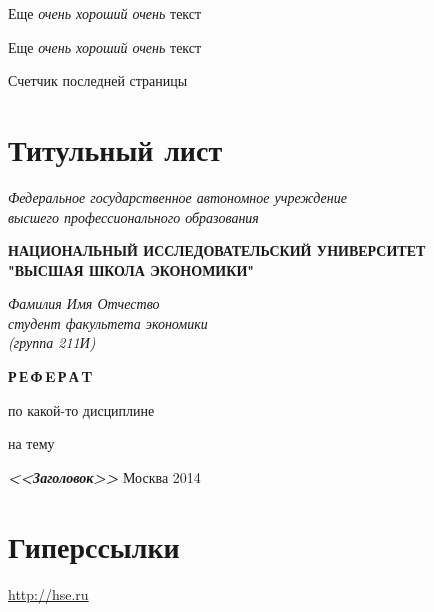 \documentclass[a4paper,14pt]{article}       %
\renewcommand{\familydefault}{\sfdefault}   %
\begin{document}
Еще \emph{очень \emph{хороший} очень} текст

Еще \emph{очень \textit{хороший} очень} текст

\newpage

Счетчик последней страницы \pageref{LastPage}

\renewcommand{\familydefault}{cmtt}\normalfont 
                                            

\section{Титульный лист}
\newpage
\thispagestyle{empty}                       %

\begin{center}
    \textit{Федеральное государственное автономное учреждение \\
    высшего профессионального образования}
    \vspace{0.5ex}

    \textbf{НАЦИОНАЛЬНЫЙ ИССЛЕДОВАТЕЛЬСКИЙ УНИВЕРСИТЕТ \\ "ВЫСШАЯ ШКОЛА ЭКОНОМИКИ"}
\end{center}

\begin{flushright}
    \noindent
    \textit{Фамилия Имя Отчество}
    \\
    \textit{студент факультета экономики \\(группа 211И)}
\end{flushright}

\begin{center}
    \vspace{13ex}
    \textbf{Р\,Е\,Ф\,E\,Р\,А\,T}
    \vspace{1ex}

    по какой-то дисциплине

    на тему

    \textbf{\textit{<<Заголовок>>}}
    \vfill                                  %
    Москва 2014
\end{center}

\newpage

\section{Гиперссылки}

\url{http://hse.ru}
\end{document}
